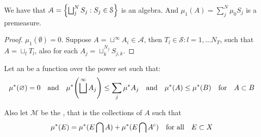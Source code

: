 \begin{thm}
    We have that \(\mathcal{A} = \Bqty{\bigsqcup^{N}_{j} S_{j} : S_{j} \in \mathcal{S}}\) is an algebra. And \(\mu_{1}(A) = \sum^{N}_{j} \mu_{0} S_{j}\) is a premeasure. 
\end{thm}

\begin{proof}
    \(\mu_{1}(\emptyset) = 0\). Suppose \(A = \sqcup^{\infty} A_{i} \in \mathcal{A}\), then  \(T_{l}\in \mathcal{S}: l = 1,\dots N_T\), such that \(A = \sqcup_{l} T_{l}\), also for each \(A_{j} = \sqcup^{N_{j}}_{k} S_{j,k}\). 
\end{proof}

Let an  be a function over the power set such that:
\begin{equation*}
    \mu^{*}(\emptyset)= 0 \qq{and} \mu^{*}\pqty{\sqcup^{\infty} A_{j}}\leq \sum_{j} \mu^{*} A_{j} \qq{and} \mu^{*}(A) \leq \mu^{*}(B)  \qq{for} A \subset B
\end{equation*}

Also let \(\mathcal{M}\) be the , that is the collections of \(A\) such that 
\begin{equation*}
    \mu^{*} (E) = \mu^{*}(E\cap A) + \mu^{*} (E\cap A^{c}) \qq{for all} E \subset X
\end{equation*}

